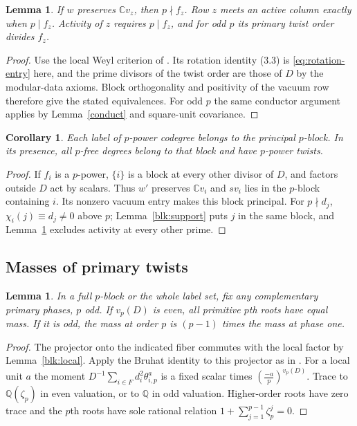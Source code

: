 \documentclass[11pt]{amsart}
\numberwithin{equation}{section}
\newtheorem{lemma}[theorem]{Lemma}
\newtheorem{corollary}[theorem]{Corollary}
\theoremstyle{definition}
\theoremstyle{plain}
\newcommand{\QQ}{\mathbb Q}
\begin{document}
\begin{lemma}\label{blk:admissible}
If $w$ preserves $\mathbb C v_z$, then $p\nmid f_z$. Row $z$ meets
an active column exactly when $p\mid f_z$. Activity of $z$ requires
$p\mid f_z$, and for odd $p$ its primary twist order divides $f_z$.
\end{lemma}
\begin{proof}
Use the local Weyl criterion of \cite[Lemma~3.4(1) and Theorem~3.6]{BDPcore}.
Its rotation identity (3.3) is \eqref{eq:rotation-entry} here, and the
prime divisors of the twist order are those of $D$ by the modular-data
axioms. Block orthogonality and positivity of the vacuum row therefore
give the stated equivalences. For odd $p$ the same conductor argument
applies by Lemma~\ref{conduct} and square-unit covariance.
\end{proof}

\begin{corollary}\label{blk:primepower}
Each label of $p$-power codegree belongs to the principal $p$-block.
In its presence, all $p$-free degrees belong to that block and have
$p$-power twists.
\end{corollary}
\begin{proof}
If $f_i$ is a $p$-power, $\{i\}$ is a block at every other divisor
of $D$, and factors outside $D$ act by scalars. Thus $w'$ preserves
$\mathbb C v_i$ and $sv_i$ lies in the $p$-block containing $i$.
Its nonzero vacuum entry makes this block principal. For $p\nmid d_j$,
$\chi_i(j)\equiv d_j\ne0$ above $p$; Lemma~\ref{blk:support} puts
$j$ in the same block, and Lemma~\ref{blk:admissible} excludes
activity at every other prime.
\end{proof}

\subsection{Masses of primary twists}
\begin{lemma}\label{blk:moments}
In a full $p$-block or the whole label set, fix any complementary
primary phases, $p$ odd. If $v_p(D)$ is even, all primitive $p$th
roots have equal mass. If it is odd, the mass at order $p$ is $(p-1)$
times the mass at phase one.
\end{lemma}
\begin{proof}
The projector onto the indicated fiber commutes with the local factor by Lemma~\ref{blk:local}. Apply the Bruhat identity to this projector as in \cite[Propositions~3.9 and~19.1]{BDPcore}. For a local unit $a$ the moment $D^{-1}\sum_{i\in F}d_i^2\theta_{i,p}^{a}$ is a fixed scalar times $(\frac{-a}{p})^{v_p(D)}$. Trace to $\QQ(\zeta_p)$ in even valuation, or to $\QQ$ in odd valuation. Higher-order roots have zero trace and the $p$th roots have sole rational relation $1+\sum_{j=1}^{p-1}\zeta_p^j=0$.
\end{proof}
\end{document}
